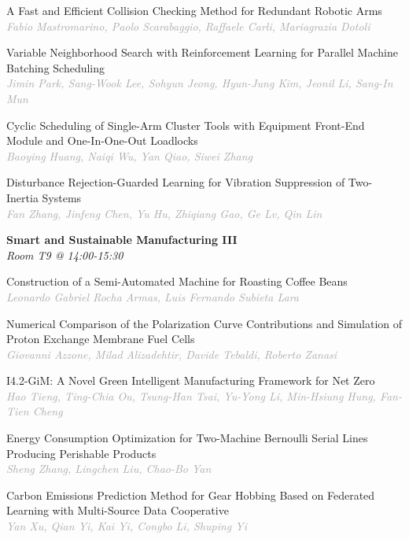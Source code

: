 \begin{multicols*}{2}
\small A Fast and Efficient Collision Checking Method for Redundant Robotic Arms\\ 
\footnotesize \textcolor{darkgray}{\textit{Fabio Mastromarino, Paolo  Scarabaggio, Raffaele  Carli, Mariagrazia  Dotoli}}

\small Variable Neighborhood Search with Reinforcement Learning for Parallel Machine Batching Scheduling\\ 
\footnotesize \textcolor{darkgray}{\textit{Jimin Park, Sang-Wook  Lee, Sohyun  Jeong, Hyun-Jung  Kim, Jeonil  Li, Sang-In  Mun}}

\small Cyclic Scheduling of Single-Arm Cluster Tools with Equipment Front-End Module and One-In-One-Out Loadlocks\\ 
\footnotesize \textcolor{darkgray}{\textit{Baoying Huang, Naiqi  Wu, Yan  Qiao, Siwei  Zhang}}

\small Disturbance Rejection-Guarded Learning for Vibration Suppression of Two-Inertia Systems\\ 
\footnotesize \textcolor{darkgray}{\textit{Fan Zhang, Jinfeng  Chen, Yu  Hu, Zhiqiang  Gao, Ge  Lv, Qin  Lin}}

\normalsize \textbf{Smart and Sustainable Manufacturing III}\\
\small \textit{Room T9 @ 14:00-15:30}

\small Construction of a Semi-Automated Machine for Roasting Coffee Beans\\ 
\footnotesize \textcolor{darkgray}{\textit{Leonardo Gabriel Rocha Armas, Luis Fernando  Subieta Lara}}

\small Numerical Comparison of the Polarization Curve Contributions and Simulation of Proton Exchange Membrane Fuel Cells\\ 
\footnotesize \textcolor{darkgray}{\textit{Giovanni Azzone, Milad  Alizadehtir, Davide  Tebaldi, Roberto  Zanasi}}

\small I4.2-GiM: A Novel Green Intelligent Manufacturing Framework for Net Zero\\ 
\footnotesize \textcolor{darkgray}{\textit{Hao Tieng, Ting-Chia  Ou, Tsung-Han  Tsai, Yu-Yong  Li, Min-Hsiung  Hung, Fan-Tien  Cheng}}

\small Energy Consumption Optimization for Two-Machine Bernoulli Serial Lines Producing Perishable Products\\ 
\footnotesize \textcolor{darkgray}{\textit{Sheng Zhang, Lingchen  Liu, Chao-Bo  Yan}}

\small Carbon Emissions Prediction Method for Gear Hobbing Based on Federated Learning with Multi-Source Data Cooperative\\ 
\footnotesize \textcolor{darkgray}{\textit{Yan Xu, Qian  Yi, Kai  Yi, Congbo  Li, Shuping  Yi}}


\end{multicols*}
